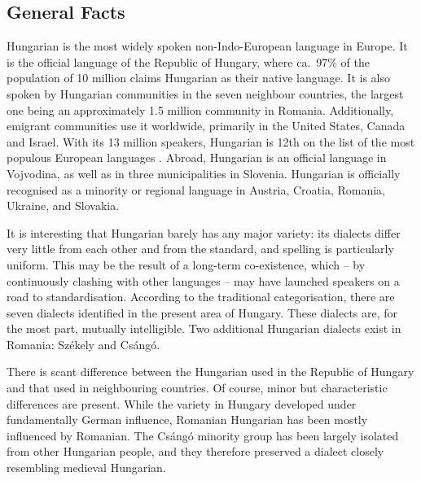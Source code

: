   \clearpage


  \begin{multicols}{2}

  \subsection{General Facts}

  Hungarian is the most widely spoken non-Indo-European language in Europe. It is the official language of the Republic of Hungary, where ca.\ 97\% of the population of 10 million claims Hungarian as their native language. It is also spoken by Hungarian communities in the seven neighbour countries, the largest one being an approximately 1.5 million community in Romania. Additionally, emigrant communities use it worldwide, primarily in the United States, Canada and Israel. With its 13 million speakers, Hungarian is 12th on the list of the most populous European languages \cite{didyouknow1}. Abroad, Hungarian is an official language in Vojvodina, as well as in three municipalities in Slovenia. Hungarian is officially recognised as a minority or regional language in Austria, Croatia, Romania, Ukraine, and Slovakia.

  It is interesting that Hungarian barely has any major variety: its dialects differ very little from each other and from the standard, and spelling is particularly uniform. This may be the result of a long-term co-existence, which -- by continuously clashing with other languages -- may have launched speakers on a road to standardisation. According to the traditional categorisation, there are seven dialects identified in the present area of Hungary. These dialects are, for the most part, mutually intelligible. Two additional Hungarian dialects exist in Romania: Székely and Csángó.

  There is scant difference between the Hungarian used in the Republic of Hungary and that used in neighbouring countries. Of course, minor but characteristic differences are present. While the variety in Hungary developed under fundamentally German influence, Romanian Hungarian has been mostly influenced by Romanian. The Csángó minority group has been largely isolated from other Hungarian people, and they therefore preserved a dialect closely resembling medieval Hungarian.


\end{multicols}
